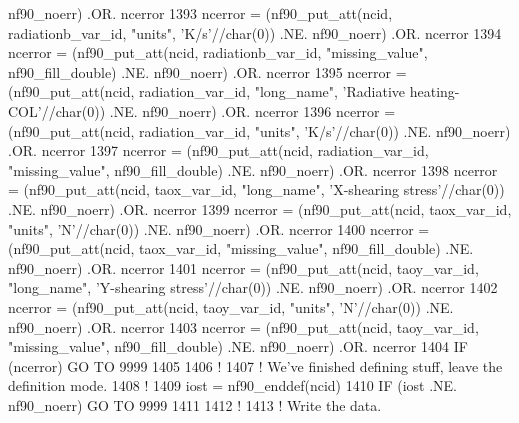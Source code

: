 \begin{DoxyCode}
      nf90\_noerr) .OR. ncerror
1393     ncerror = (nf90\_put\_att(ncid, radiationb\_var\_id, \textcolor{stringliteral}{"units"}, \textcolor{stringliteral}{'K/s'}//char(0))                       .NE. 
      nf90\_noerr) .OR. ncerror
1394     ncerror = (nf90\_put\_att(ncid, radiationb\_var\_id, \textcolor{stringliteral}{"missing\_value"}, nf90\_fill\_double)             .NE. 
      nf90\_noerr) .OR. ncerror
1395     ncerror = (nf90\_put\_att(ncid, radiation\_var\_id, \textcolor{stringliteral}{"long\_name"}, \textcolor{stringliteral}{'Radiative heating-COL'}//char(0))  .NE. 
      nf90\_noerr) .OR. ncerror
1396     ncerror = (nf90\_put\_att(ncid, radiation\_var\_id, \textcolor{stringliteral}{"units"}, \textcolor{stringliteral}{'K/s'}//char(0))                        .NE. 
      nf90\_noerr) .OR. ncerror
1397     ncerror = (nf90\_put\_att(ncid, radiation\_var\_id, \textcolor{stringliteral}{"missing\_value"}, nf90\_fill\_double)              .NE. 
      nf90\_noerr) .OR. ncerror
1398     ncerror = (nf90\_put\_att(ncid, taox\_var\_id, \textcolor{stringliteral}{"long\_name"}, \textcolor{stringliteral}{'X-shearing stress'}//char(0))           .NE. 
      nf90\_noerr) .OR. ncerror
1399     ncerror = (nf90\_put\_att(ncid, taox\_var\_id, \textcolor{stringliteral}{"units"}, \textcolor{stringliteral}{'N'}//char(0))                               .NE. 
      nf90\_noerr) .OR. ncerror
1400     ncerror = (nf90\_put\_att(ncid, taox\_var\_id, \textcolor{stringliteral}{"missing\_value"}, nf90\_fill\_double)                   .NE. 
      nf90\_noerr) .OR. ncerror
1401     ncerror = (nf90\_put\_att(ncid, taoy\_var\_id, \textcolor{stringliteral}{"long\_name"}, \textcolor{stringliteral}{'Y-shearing stress'}//char(0))           .NE. 
      nf90\_noerr) .OR. ncerror
1402     ncerror = (nf90\_put\_att(ncid, taoy\_var\_id, \textcolor{stringliteral}{"units"}, \textcolor{stringliteral}{'N'}//char(0))                               .NE. 
      nf90\_noerr) .OR. ncerror
1403     ncerror = (nf90\_put\_att(ncid, taoy\_var\_id, \textcolor{stringliteral}{"missing\_value"}, nf90\_fill\_double)                   .NE. 
      nf90\_noerr) .OR. ncerror
1404     \textcolor{keywordflow}{IF} (ncerror) \textcolor{keywordflow}{GO TO} 9999
1405 
1406     \textcolor{comment}{!}
1407     \textcolor{comment}{! We've finished defining stuff, leave the definition mode.}
1408     \textcolor{comment}{!}
1409     iost    = nf90\_enddef(ncid)
1410     \textcolor{keywordflow}{IF} (iost .NE. nf90\_noerr) \textcolor{keywordflow}{GO TO} 9999
1411 
1412     \textcolor{comment}{!}
1413     \textcolor{comment}{! Write the data.}

\end{DoxyCode}
